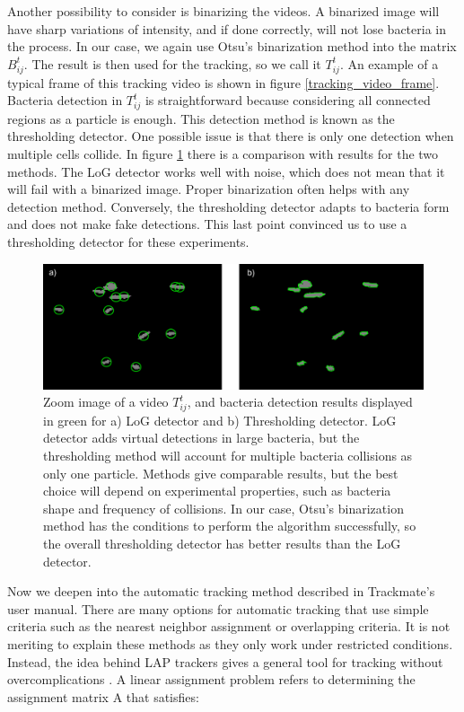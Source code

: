 Another possibility to consider is binarizing the videos. A binarized image will have sharp variations of intensity, and if done correctly, will not lose bacteria in the process. In our case, we again use Otsu's binarization method into the matrix $B_{ij}^t$. The result is then used for the tracking, so we call it $T_{ij}^t$. An example of a typical frame of this tracking video is shown in figure \ref{tracking_video_frame}. Bacteria detection in  $T_{ij}^t$ is straightforward because considering all connected regions as a particle is enough. This detection method is known as the thresholding detector. One possible issue is that there is only one detection when multiple cells collide. In figure \ref{detection_method_comparison} there is a comparison with results for the two methods. The LoG detector works well with noise, which does not mean that it will fail with a binarized image. Proper binarization often helps with any detection method. Conversely, the thresholding detector adapts to bacteria form and does not make fake detections. This last point convinced us to use a thresholding detector for these experiments.

\begin{figure}
	\centering
	\includegraphics[width=\linewidth]{imagenes/detection_method_comparison.png}
	\caption[Detection method comparison]{ Zoom image of a video $T_{ij}^t$, and bacteria detection results displayed in green for a) LoG detector and b) Thresholding detector. LoG detector adds virtual detections in large bacteria, but the thresholding method will account for multiple bacteria collisions as only one particle. Methods give comparable results, but the best choice will depend on experimental properties, such as bacteria shape and frequency of collisions. In our case, Otsu's binarization method has the conditions to perform the algorithm successfully, so the overall thresholding detector has better results than the LoG detector. }
	\label{detection_method_comparison}
\end{figure}

Now we deepen into the automatic tracking method described in Trackmate's user manual. There are many options for automatic tracking that use simple criteria such as the nearest neighbor assignment or overlapping criteria. It is not meriting to explain these methods as they only work under restricted conditions. Instead, the idea behind LAP trackers gives a general tool for tracking without overcomplications \cite{Jaqaman2008RobustSequences}. A linear assignment problem refers to determining the assignment matrix A that satisfies:

